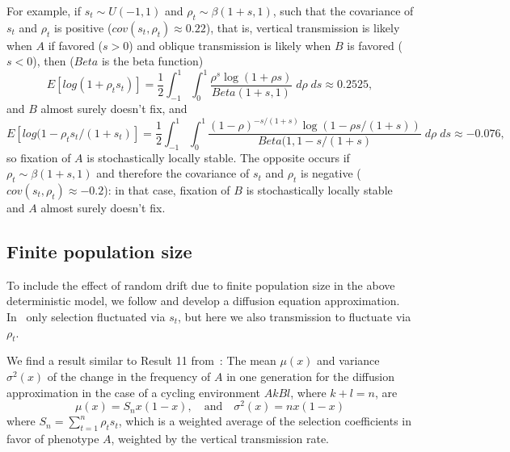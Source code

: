 \documentclass[12pt]{extarticle} %
\makeatletter
\renewcommand\section{\@startsection {section}{1}{\z@}%
     {-2.5ex \@plus -1ex \@minus -.2ex}%
     {1.3ex \@plus.2ex}%
    {\Large\bfseries}}
\makeatother
\begin{document}
For example, if $s_t \sim U(-1,1)$ and $\rho_t \sim \beta(1+s, 1)$, such that the covariance of $s_t$ and $\rho_t$ is positive ($cov(s_t, \rho_t) \approx 0.22$), that is, vertical transmission is likely when $A$ if favored ($s>0$) and oblique transmission is likely when $B$ is favored ($s<0$), then ($Beta$ is the beta function) 
\begin{equation}
E[log(1+\rho_t s_t)] = \frac{1}{2} \int_{-1}^{1} {\int_0^1 {\frac{\rho^s \log{(1+\rho s)}}{Beta(1+s, 1)}  \; d\rho}\; ds} \approx 0.2525,
\end{equation}
and $B$ almost surely doesn't fix, and
\begin{equation}
E[log(1-\rho_t s_t / (1+s_t)] = \frac{1}{2} \int_{-1}^{1} {\int_0^1 {\frac{(1-\rho)^{-s/(1+s)} \log{(1-\rho s / (1+s))}}{Beta(1, 1-s/(1+s)}  \; d\rho}\; ds} \approx -0.076,
\end{equation}
so fixation of $A$ is stochastically locally stable.
The opposite occurs if $\rho_t \sim \beta(1+s, 1)$ and therefore the covariance of $s_t$ and $\rho_t$ is negative ($cov(s_t, \rho_t) \approx -0.2$): in that case, fixation of $B$ is stochastically locally stable and $A$ almost surely doesn't fix.

\subsection*{Finite population size}

To include the effect of random drift due to finite population size in the above deterministic model, we follow \citet{Ram2018} and develop a diffusion equation approximation.
In~\citet{Ram2018} only selection fluctuated via $s_t$, but here we also transmission to fluctuate via $\rho_t$. 

We find a result similar to Result 11 from~\citet{Ram2018}:
The mean $\mu(x)$ and variance $\sigma^2(x)$ of the change in the frequency of $A$ in one generation for the diffusion approximation in the case of a cycling environment $AkBl$, where $k+l=n$, are
\begin{equation}
\mu(x) = S_n x(1-x), \quad \text{and} \quad \sigma^2(x) = n x (1-x)
\end{equation}
where $S_n = \sum_{t=1}^{n}{\rho_t s_t}$, which is a weighted average of the selection coefficients in favor of phenotype $A$, weighted by the vertical transmission rate.

\end{document}
